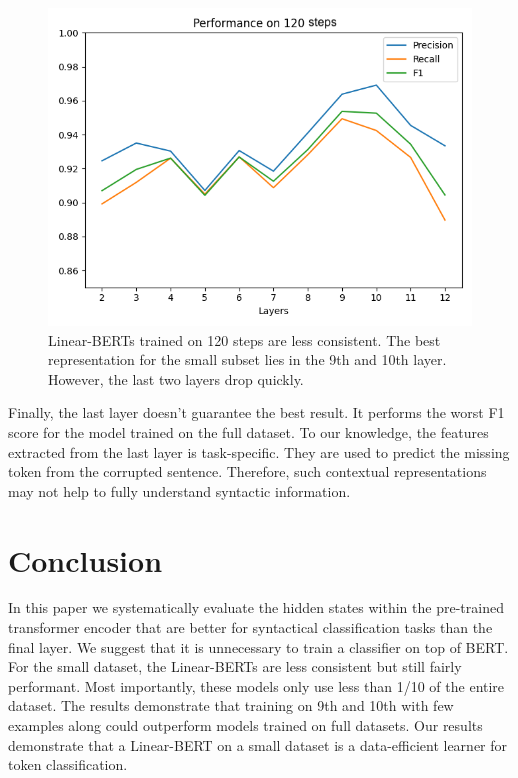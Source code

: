 \documentclass[11pt,a4paper]{article}
\begin{document}
 
\begin{figure}
\begin{center}
  \includegraphics[width=\linewidth]{f1-120.png}
  \caption{\label{fig:f1-120}Linear-BERTs trained on 120 steps are less consistent. The best representation for the small subset lies in the 9th and 10th layer. However, the last two layers drop quickly.}
\end{center}
\end{figure}

Finally, the last layer doesn't guarantee the best result. It performs the worst F1 score for the model trained on the full dataset. To our knowledge, the features extracted from the last layer is task-specific. They are used to predict the missing token from the corrupted sentence. Therefore, such contextual representations may not help to fully understand syntactic information.

\section{Conclusion}

In this paper we systematically evaluate the hidden states within the pre-trained transformer encoder that are better for syntactical classification tasks than the final layer. We suggest that it is unnecessary to train a classifier on top of BERT. For the small dataset, the Linear-BERTs are less consistent but still fairly performant. Most importantly, these models only use less than 1/10 of the entire dataset. The results demonstrate that training on 9th and 10th with few examples along could outperform models trained on full datasets. Our results demonstrate that a Linear-BERT on a small dataset is a data-efficient learner for token classification.
\end{document}
